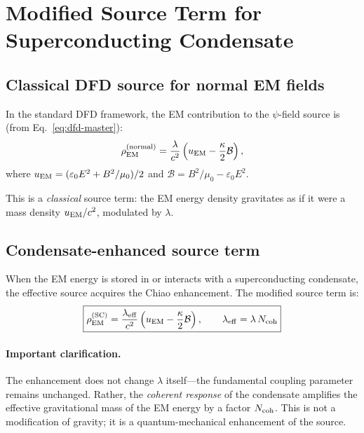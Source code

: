 \documentclass[12pt,aps,prd,twocolumn,superscriptaddress,nofootinbib]{revtex4-2}
\newcommand{\lam}{\lambda}
\newcommand{\kap}{\kappa}
\newcommand{\calB}{\mathcal{B}}
\begin{document}
\section{Modified Source Term for Superconducting Condensate}
\label{sec:source-term}

\subsection{Classical DFD source for normal EM fields}

In the standard DFD framework, the EM contribution to the
$\psi$-field source is (from Eq.~\eqref{eq:dfd-master}):
\begin{equation}\label{eq:source-normal}
\rho_{\rm EM}^{(\rm normal)} = \frac{\lam}{c^2}
\left(u_{\rm EM} - \frac{\kap}{2}\calB\right),
\end{equation}
where $u_{\rm EM} = (\varepsilon_0 E^2 + B^2/\mu_0)/2$ and
$\calB = B^2/\mu_0 - \varepsilon_0 E^2$.

This is a \emph{classical} source term: the EM energy density
gravitates as if it were a mass density $u_{\rm EM}/c^2$, modulated
by $\lam$.

\subsection{Condensate-enhanced source term}

When the EM energy is stored in or interacts with a superconducting
condensate, the effective source acquires the Chiao enhancement.
The modified source term is:
\begin{equation}\label{eq:source-SC}
\boxed{
\rho_{\rm EM}^{(\rm SC)} = \frac{\lam_{\rm eff}}{c^2}
\left(u_{\rm EM} - \frac{\kap}{2}\calB\right),
\qquad
\lam_{\rm eff} = \lam\,N_{\rm coh}
}
\end{equation}

\paragraph{Important clarification.} The enhancement does not change
$\lam$ itself---the fundamental coupling parameter remains unchanged.
Rather, the \emph{coherent response} of the condensate amplifies the
effective gravitational mass of the EM energy by a factor $N_{\rm coh}$.
This is not a modification of gravity; it is a quantum-mechanical
enhancement of the source.
\end{document}
